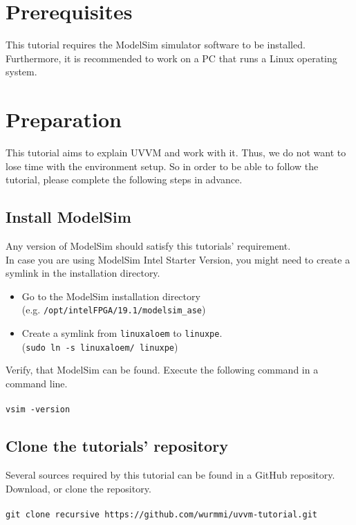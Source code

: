 \section{Prerequisites}

This tutorial requires the ModelSim simulator software to be installed.
Furthermore, it is recommended to work on a PC that runs a Linux operating system.

\section{Preparation}

This tutorial aims to explain UVVM and work with it.
Thus, we do not want to lose time with the environment setup.
So in order to be able to follow the tutorial, please complete the
following steps in advance.

\subsection{Install ModelSim}

Any version of ModelSim should satisfy this tutorials' requirement.\\

In case you are using ModelSim Intel Starter Version, you might need to
create a symlink in the installation directory.
\begin{itemize}
  \item Go to the ModelSim installation directory\\
        (e.g. \texttt{/opt/intelFPGA/19.1/modelsim\_ase})
  \item Create a symlink from \texttt{linuxaloem} to \texttt{linuxpe}.\\
        (\texttt{sudo ln -s linuxaloem/ linuxpe})
\end{itemize}

Verify, that ModelSim can be found. Execute the following command in a command line.\\
\\
\texttt{vsim -version}

\subsection{Clone the tutorials' repository}

Several sources required by this tutorial can be found in a GitHub repository.\\
Download, or clone the repository.\\
\\
\texttt{git clone \textendash \textendash recursive https://github.com/wurmmi/uvvm-tutorial.git }
